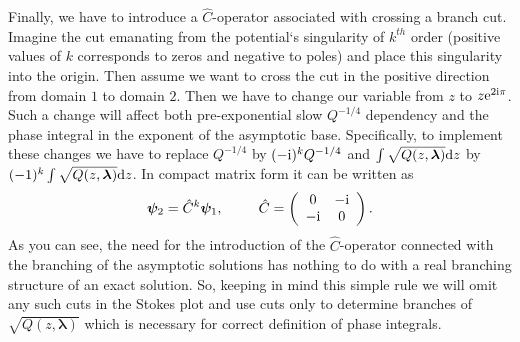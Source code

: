 \documentclass[12pt]{iopart}
\def\C{\hat{C}}
\def\psii{\bm\psi}
\def\lmbd{\bm{\lambda}}
\begin{document}
Finally, we have to introduce a $\C$-operator associated with crossing a branch cut. Imagine the cut emanating from the potential`s singularity of $k^{th}$ order (positive values of $k$ corresponds to zeros and negative to poles) and place this singularity into the origin. Then assume we want to cross the cut in the positive direction from domain $1$ to domain $2$. Then we have to change our variable from $z$ to $z \mathrm{e}^{2\mathrm{i}\pi}$. Such a change will affect both pre-exponential slow $Q^{-1/4}$ dependency and the phase integral in the exponent of the asymptotic base. Specifically, to implement these changes we have to replace 
$Q^{-1/4}$ by $(-\mathrm{i})^k Q^{-1/4}$ 
and $\int \sqrt{Q(z,\lmbd)} \rmd z$ by $(-1)^k \int \sqrt{Q(z,\lmbd)} \rmd z$. In compact matrix form it can be written as
\begin{eqnarray}
\psii_2 = \C^k \psii_1, \qquad
\C =  \left(\begin{array}{*{2}{c}} 0 & -\rmi \\ -\rmi & 0 \end{array}\right).    \label{eq:C}
\end{eqnarray}
As you can see, the need for the introduction of the $\C$-operator connected with the branching of the asymptotic solutions has nothing to do with a real branching structure of an exact solution. So, keeping in mind this simple rule we will omit any such cuts in the Stokes plot and use cuts only to determine branches of $\sqrt{Q(z,\lmbd)}$ which is necessary for correct definition of phase integrals. 
\end{document}
